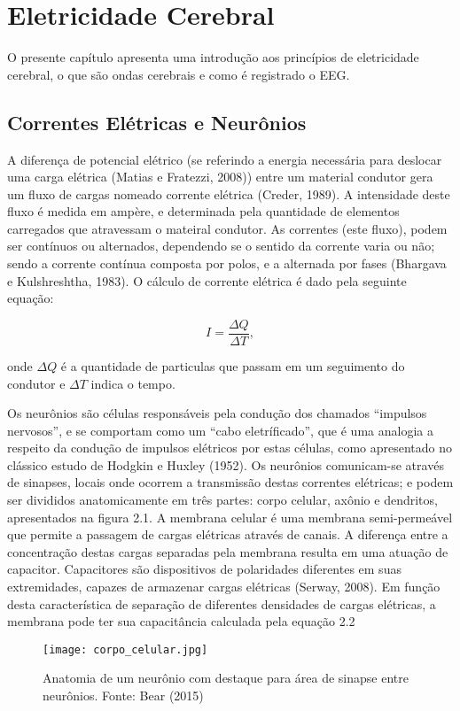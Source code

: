 \chapter{Eletricidade Cerebral}

O presente capítulo apresenta uma introdução aos princípios de eletricidade cerebral, o que são ondas cerebrais e como é registrado o EEG.

\section{Correntes Elétricas e Neurônios}
A diferença de potencial elétrico (se referindo a energia necessária para deslocar uma carga elétrica (Matias e Fratezzi, 2008)) entre um material condutor gera um fluxo de cargas nomeado corrente elétrica (Creder, 1989). A intensidade deste fluxo é medida em ampère, e determinada pela quantidade de elementos carregados que atravessam o mateiral condutor. As correntes (este fluxo), podem ser contínuos ou alternados, dependendo se o sentido da corrente varia ou não; sendo a corrente contínua composta por polos, e a alternada por fases (Bhargava e Kulshreshtha, 1983). O cálculo de corrente elétrica é dado pela seguinte equação:

\begin{equation}
    I = \frac{\Delta Q }{\Delta T},
\end{equation}

onde $\Delta Q$ é a quantidade de particulas que passam em um seguimento do condutor e $\Delta T$ indica o tempo. 

Os neurônios são células responsáveis pela condução dos chamados “impulsos nervosos”, e se comportam como um “cabo eletríficado”, que é uma analogia a respeito da condução de impulsos elétricos por estas células, como apresentado no clássico estudo de Hodgkin e Huxley (1952). Os neurônios comunicam-se através de sinapses, locais onde ocorrem a transmissão destas correntes elétricas; e podem ser divididos anatomicamente em três partes: corpo celular, axônio e dendritos, apresentados na figura 2.1. A membrana celular é uma membrana semi-permeável que permite a passagem de cargas elétricas através de canais. A diferença entre a concentração destas cargas separadas pela membrana resulta em uma atuação de capacitor. Capacitores são dispositivos de polaridades diferentes em suas extremidades, capazes de armazenar cargas elétricas (Serway, 2008). Em função desta característica de separação de diferentes densidades de cargas elétricas, a membrana pode ter sua capacitância calculada pela equação 2.2
\begin{figure}
    \centering
    \texttt{[image: corpo\_celular.jpg]}
    \caption{Anatomia de um neurônio com destaque para área de sinapse entre neurônios. Fonte: Bear (2015)}
\end{figure}


